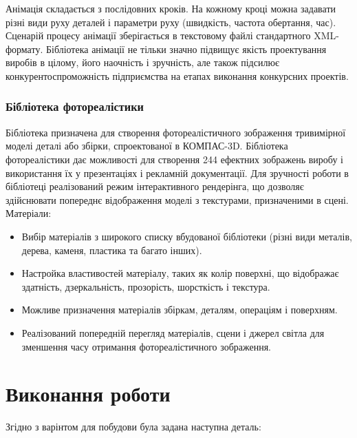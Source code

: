 Анімація складається з послідовних кроків. На кожному кроці можна задавати різні види
руху деталей і параметри руху (швидкість, частота обертання, час). Сценарій процесу анімації
зберігається в текстовому файлі стандартного XML-формату. Бібліотека анімації не тільки значно
підвищує якість проектування виробів в цілому, його наочність і зручність, але також підсилює
конкурентоспроможність підприємства на етапах виконання конкурсних проектів.

\subsubsection{Бібліотека фотореалістики}
Бібліотека призначена для створення фотореалістичного зображення тривимірної моделі деталі або
збірки, спроектованої в КОМПАС-3D. Бібліотека фотореалістики дає можливості для створення 244
ефектних зображень виробу і використання їх у презентаціях і рекламній документації. Для зручності
роботи в бібліотеці реалізований режим інтерактивного рендерінга, що дозволяє здійснювати попереднє
відображення моделі з текстурами, призначеними в сцені. Матеріали:

\begin{itemize}
\item Вибір матеріалів з широкого списку вбудованої бібліотеки (різні види металів, дерева, каменя,
  пластика та багато інших).
\item Настройка властивостей матеріалу, таких як колір поверхні, що відображає здатність,
  дзеркальність, прозорість, шорсткість і текстура.
\item Можливе призначення матеріалів збіркам, деталям, операціям і поверхням.
\item Реалізований попередній перегляд матеріалів, сцени і джерел світла для зменшення часу
  отримання фотореалістичного зображення.
\end{itemize}

\section{Виконання роботи}

Згідно з варінтом для побудови була задана наступна деталь:

